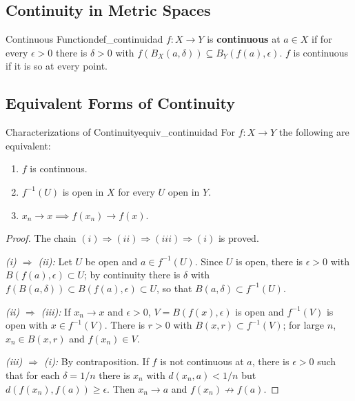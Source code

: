 \documentclass[11pt, a4paper]{article}
\begin{document}
\subsection{Continuity in Metric Spaces}

\begin{definicion}{Continuous Function}{def_continuidad}
$f: X \to Y$ is \textbf{continuous} at $a \in X$ if for every $\epsilon > 0$ there is $\delta > 0$ with
$f(B_X(a, \delta)) \subseteq B_Y(f(a), \epsilon)$. $f$ is continuous if it is so at every point.
\end{definicion}

\subsection{Equivalent Forms of Continuity}

\begin{teorema}{Characterizations of Continuity}{equiv_continuidad}
For $f: X \to Y$ the following are equivalent:
\begin{enumerate}
    \item[i)] $f$ is continuous.
    \item[ii)] $f^{-1}(U)$ is open in $X$ for every $U$ open in $Y$.
    \item[iii)] $x_n \to x \implies f(x_n) \to f(x)$.
\end{enumerate}
\end{teorema}

\begin{proof}
The chain $(i) \Rightarrow (ii) \Rightarrow (iii) \Rightarrow (i)$ is proved.

\textit{(i) $\Rightarrow$ (ii):} Let $U$ be open and $a \in f^{-1}(U)$. Since $U$ is open, there is
$\epsilon > 0$ with $B(f(a), \epsilon) \subset U$; by continuity there is $\delta$ with
$f(B(a, \delta)) \subset B(f(a), \epsilon) \subset U$, so that $B(a, \delta) \subset f^{-1}(U)$.

\textit{(ii) $\Rightarrow$ (iii):} If $x_n \to x$ and $\epsilon > 0$, $V = B(f(x), \epsilon)$ is
open and $f^{-1}(V)$ is open with $x \in f^{-1}(V)$. There is $r > 0$ with $B(x, r) \subset f^{-1}(V)$;
for large $n$, $x_n \in B(x, r)$ and $f(x_n) \in V$.

\textit{(iii) $\Rightarrow$ (i):} By contraposition. If $f$ is not continuous at $a$, there is
$\epsilon > 0$ such that for each $\delta = 1/n$ there is $x_n$ with $d(x_n, a) < 1/n$ but
$d(f(x_n), f(a)) \ge \epsilon$. Then $x_n \to a$ and $f(x_n) \not\to f(a)$.
\end{proof}
\end{document}
